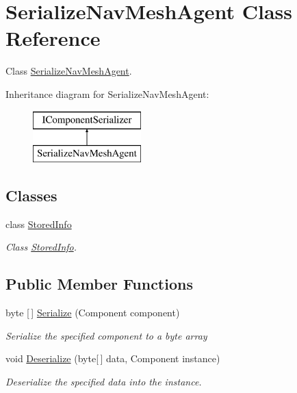 \hypertarget{class_serialize_nav_mesh_agent}{}\section{Serialize\+Nav\+Mesh\+Agent Class Reference}
\label{class_serialize_nav_mesh_agent}


Class \hyperlink{class_serialize_nav_mesh_agent}{Serialize\+Nav\+Mesh\+Agent}.  


Inheritance diagram for Serialize\+Nav\+Mesh\+Agent\+:\begin{figure}[H]
\begin{center}
\leavevmode
\includegraphics[height=2.000000cm]{class_serialize_nav_mesh_agent}
\end{center}
\end{figure}
\subsection*{Classes}
\begin{DoxyCompactItemize}
\item 
class \hyperlink{class_serialize_nav_mesh_agent_1_1_stored_info}{Stored\+Info}
\begin{DoxyCompactList}\small\item\em Class \hyperlink{class_serialize_nav_mesh_agent_1_1_stored_info}{Stored\+Info}. \end{DoxyCompactList}\end{DoxyCompactItemize}
\subsection*{Public Member Functions}
\begin{DoxyCompactItemize}
\item 
byte \mbox{[}$\,$\mbox{]} \hyperlink{class_serialize_nav_mesh_agent_a74cea446ba02a0814a3c215c27fa81d8}{Serialize} (Component component)
\begin{DoxyCompactList}\small\item\em Serialize the specified component to a byte array \end{DoxyCompactList}\item 
void \hyperlink{class_serialize_nav_mesh_agent_ad5a28c80e751f4727a1a4b83c06b5428}{Deserialize} (byte\mbox{[}$\,$\mbox{]} data, Component instance)
\begin{DoxyCompactList}\small\item\em Deserialize the specified data into the instance. \end{DoxyCompactList}\end{DoxyCompactItemize}


